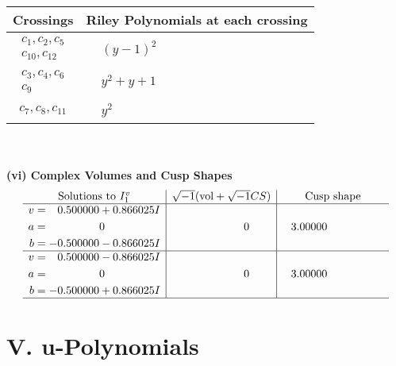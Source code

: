 \documentclass[1p]{elsarticle_modified}
\theoremstyle{definition}
\newcommand{\I}{\sqrt{-1}}
\begin{document}
\begin{tabular}{m{50pt}|m{274pt}}
Crossings & \hspace{64pt}Riley Polynomials at each crossing \\
\hline $$\begin{aligned}c_{1},c_{2},c_{5}\\c_{10},c_{12}\end{aligned}$$&$\begin{aligned}
&(y-1)^2
\end{aligned}$\\
\hline $$\begin{aligned}c_{3},c_{4},c_{6}\\c_{9}\end{aligned}$$&$\begin{aligned}
&y^2+y+1
\end{aligned}$\\
\hline $$\begin{aligned}c_{7},c_{8},c_{11}\end{aligned}$$&$\begin{aligned}
&y^2
\end{aligned}$\\
\hline
\end{tabular}\\~\\
\newpage\flushleft \textbf{(vi) Complex Volumes and Cusp Shapes}
$$\begin{array}{c|c|c}  
\text{Solutions to }I^v_{1}& \I (\text{vol} + \sqrt{-1}CS) & \text{Cusp shape}\\
 \hline 
\begin{aligned}
v &= \phantom{-}0.500000 + 0.866025 I \\
a &= \phantom{-0.000000 } 0 \\
b &= -0.500000 - 0.866025 I\end{aligned}
 & \phantom{-0.000000 } 0 & \phantom{-}3.00000\phantom{ +0.000000I} \\ \hline\begin{aligned}
v &= \phantom{-}0.500000 - 0.866025 I \\
a &= \phantom{-0.000000 } 0 \\
b &= -0.500000 + 0.866025 I\end{aligned}
 & \phantom{-0.000000 } 0 & \phantom{-}3.00000\phantom{ +0.000000I}\\
 \hline 
 \end{array}$$\newpage
\newpage\renewcommand{\arraystretch}{1}
\centering \section*{ V. u-Polynomials}
\end{document}
